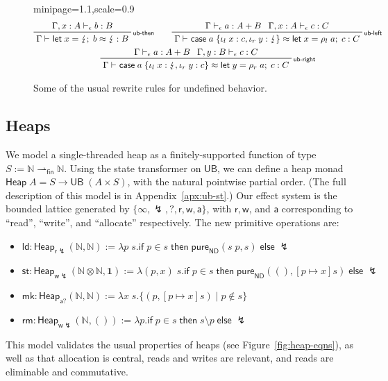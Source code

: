 \documentclass[acmsmall,screen,anonymous,review]{acmart}
\newcommand{\mb}[1]{\ensuremath{\mathbf{#1}}}
\newcommand{\ms}[1]{\ensuremath{\mathsf{#1}}}
\newcommand{\nats}{\mathbb{N}}
\newcommand{\lto}{:}
\newcommand{\linl}[1]{\iota_l\;{#1}}
\newcommand{\linr}[1]{\iota_r\;{#1}}
\newcommand{\letexpr}[3]{\ensuremath{\ms{let}\;#1 = #2;\;#3}}
\newcommand{\caseexpr}[5]{\ms{case}\;#1\;\{\linl{#2} \lto #3, \linr{#4} \lto #5\}}
\newcommand{\rle}[1]{{\scriptsize\textsf{#1}}}
\newcommand{\hasty}[4]{#1 \vdash_{#2} #3: {#4}}
\newcommand{\teqv}{\approx}
\newcommand{\tmeq}[5]{#1 \vdash_{#2} #3 \teqv #4 : {#5}}
\newcommand{\pto}{\rightharpoonup}
\newcommand{\fpto}{\pto_{\ms{fin}}}
\newcommand{\ubeff}{\lightning}
\begin{document}
\begin{figure}
  \begin{adjustbox}{minipage=1.1\textwidth,scale=0.9}
  \begin{gather*}
    \prftree[r]{\rle{ub-then}}
      {\hasty{\Gamma, x : A}{\epsilon}{b}{B}}
      {\tmeq{\Gamma}{}{\letexpr{x}{\ubeff}{b}}{\ubeff}{B}} \qquad
    \prftree[r]{\rle{ub-left}}
      {\hasty{\Gamma}{\epsilon}{a}{A + B}}
      {\hasty{\Gamma, x : A}{\epsilon}{c}{C}}
      {\tmeq{\Gamma}{}{\caseexpr{a}{x}{c}{y}{\ubeff}}{\letexpr{x}{\rho_l\;a}{c}}{C}}
    \\
    \prftree[r]{\rle{ub-right}}
      {\hasty{\Gamma}{\epsilon}{a}{A + B}}
      {\hasty{\Gamma, y : B}{\epsilon}{c}{C}}
      {\tmeq{\Gamma}{}{\caseexpr{a}{x}{\ubeff}{y}{c}}{\letexpr{y}{\rho_r\;a}{c}}{C}}
  \end{gather*}
  \end{adjustbox}
  \caption{
    Some of the usual rewrite rules for undefined behavior.
  }
  \Description{}
  \label{fig:ub-rewrites}
\end{figure}

\subsection{Heaps}

\label{ssec:heaps}

We model a single-threaded heap
as a finitely-supported function of type $S := \nats \fpto \nats$. Using the state transformer on
 $\ms{UB}$, we can define a heap monad 
$\ms{Heap}\;A = S \to \ms{UB}\;(A \times S)$, with the natural pointwise partial order.
(The full description of this model is in Appendix~\ref{apx:ub-st}.)
% 
Our effect system is the bounded lattice generated by 
$\{\infty, \ubeff, ?, \ms{r}, \ms{w}, \ms{a}\}$, with $\ms{r}, \ms{w}$, and $\ms{a}$ corresponding to 
``read'', ``write'', and ``allocate'' respectively. The new primitive operations are:
\begin{itemize}
  \item $\ms{ld} : \ms{Heap}_{\ms{r}\ubeff}(\nats, \nats) := 
    \lambda p\; s.
      \ms{if}\;p \in s\;\ms{then}\;\ms{pure}_{\ms{ND}}(s\;p, s)\;\ms{else}\;\ubeff
    $
  \item $\ms{st} : \ms{Heap}_{\ms{w}\ubeff}(\nats \otimes \nats, \mb{1}) :=
    \lambda (p, x)\; s.
      \ms{if}\;p \in s\;\ms{then}\;\ms{pure}_{\ms{ND}}((), [p \mapsto x]s)\;\ms{else}\;\ubeff
    $
  \item $\ms{mk} : \ms{Heap}_{\ms{a}?}(\nats, \nats) :=
    \lambda x\; s. \{(p, [p \mapsto x]s) \mid p \notin s\}
    $
  \item $\ms{rm} : \ms{Heap}_{\ms{w}\ubeff}(\nats, ()) :=
    \lambda p . \ms{if}\;p \in s\;\ms{then}\;s \setminus p\;\ms{else}\;\ubeff
    $
\end{itemize}
This model validates the usual properties of heaps (see Figure~\ref{fig:heap-eqns}), as well as
that allocation is central, reads and writes are relevant, and reads are eliminable and commutative.
%
\end{document}
